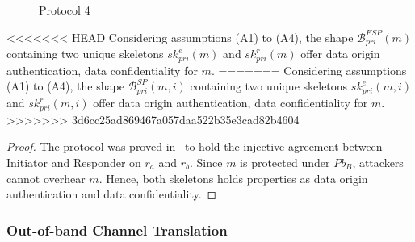 \begin{figure}
\begin{center}
\end{center}
\caption{Protocol 4} 
\label{protocol4}
\end{figure}

\begin{Proposition}
<<<<<<< HEAD
Considering assumptions (A1) to (A4), the shape $\mathcal{B}^{ESP}_{pri}(m)$ containing two unique skeletons $sk^e_{pri}(m)$ and $sk^r_{pri}(m)$ offer data origin authentication, data confidentiality for $m$.   
=======
Considering assumptions (A1) to (A4), the shape $\mathcal{B}^{SP}_{pri}(m,i)$ containing two unique skeletons $sk^e_{pri}(m,i)$ and $sk^r_{pri}(m,i)$ offer data origin authentication, data confidentiality for $m$.   
>>>>>>> 3d6cc25ad869467a057daa522b35e3cad82b4604
\end{Proposition}

\begin{proof}
The protocol was proved in~\cite{674832} to hold the injective agreement between Initiator and Responder on $r_a$ and $r_b$. Since $m$ is protected under $Pb_B$, attackers cannot overhear $m$. Hence, both skeletons holds properties as data origin authentication and data confidentiality.
\end{proof}

\subsubsection*{Out-of-band Channel Translation}

